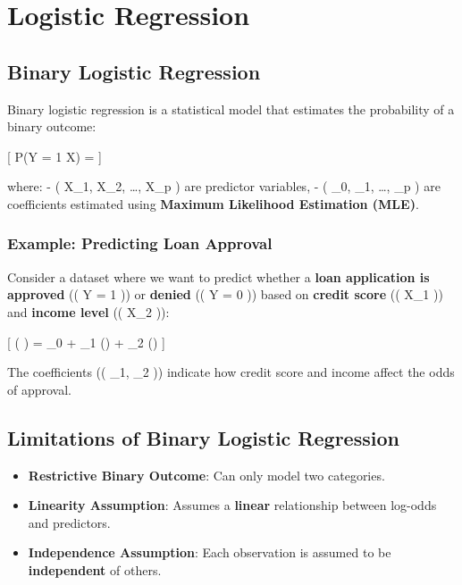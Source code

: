 \documentclass[
  letterpaper,
  DIV=11,
  numbers=noendperiod]{scrartcl}
\providecommand{\tightlist}{%
  \setlength{\itemsep}{0pt}\setlength{\parskip}{0pt}}\usepackage{longtable,booktabs,array}
\begin{document}
\section{Logistic Regression}\label{logistic-regression}

\subsection{Binary Logistic
Regression}\label{binary-logistic-regression}

Binary logistic regression is a statistical model that estimates the
probability of a binary outcome:

{[} P(Y = 1 \textbar{} X) =
{]}

where: - ( X\_1, X\_2, \dots, X\_p ) are predictor variables, - (
\beta\_0, \beta\_1, \dots, \beta\_p ) are coefficients estimated using
\textbf{Maximum Likelihood Estimation (MLE)}.

\subsubsection{Example: Predicting Loan
Approval}\label{example-predicting-loan-approval}

Consider a dataset where we want to predict whether a \textbf{loan
application is approved} (( Y = 1 )) or \textbf{denied} (( Y = 0 ))
based on \textbf{credit score} (( X\_1 )) and \textbf{income level} ((
X\_2 )):

{[} \log \left( 
\right) = \beta\_0 + \beta\_1 () + \beta\_2
() {]}

The coefficients (( \beta\_1, \beta\_2 )) indicate how credit score and
income affect the odds of approval.

\subsection{Limitations of Binary Logistic
Regression}\label{limitations-of-binary-logistic-regression}

\begin{itemize}
\tightlist
\item
  \textbf{Restrictive Binary Outcome}: Can only model two categories.
\item
  \textbf{Linearity Assumption}: Assumes a \textbf{linear} relationship
  between log-odds and predictors.
\item
  \textbf{Independence Assumption}: Each observation is assumed to be
  \textbf{independent} of others.
\end{itemize}
\end{document}
